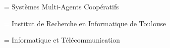 
\EquipeAccueil = {Systèmes Multi-Agents Coopératifs}

\LaboratoireAcceuil = {Institut de Recherche en Informatique de
Toulouse}

\EcoleDoctorale= {Informatique et Télécommunication}

%
\def\blanc{\hspace*{.5cm}}

\MakeThesisTitlePage

